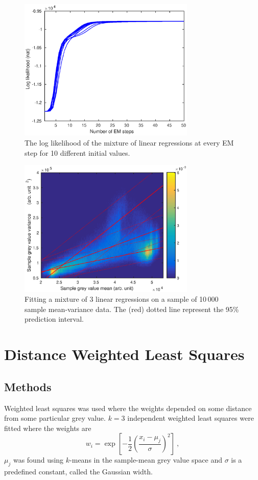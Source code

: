 \documentclass[12pt]{report}
\begin{document}
\begin{figure}[p]
	\centering	
	\includegraphics[width=0.75\textwidth]{figures/meanVar/mixture_lnL.eps}
	\caption{The log likelihood of the mixture of linear regressions at every EM step for 10 different initial values.}
	\label{fig:mixture_lnL}
\end{figure}

\begin{figure}[p]
	\centering	
	\includegraphics[width=0.75\textwidth]{figures/meanVar/mixture_histogram.eps}
	\caption{Fitting a mixture of 3 linear regressions on a sample of 10\,000 sample mean-variance data. The (red) dotted line represent the 95\% prediction interval.}
	\label{fig:mixture_histogram}
\end{figure}

\section{Distance Weighted Least Squares}
\subsection{Methods}
Weighted least squares was used where the weights depended on some distance from some particular grey value. $k=3$ independent weighted least squares were fitted where the weights are
\begin{equation}
w_i=\exp\left[-\frac{1}{2}\left(\frac{x_i-\mu_j}{\sigma}\right)^2\right] \ ,
\end{equation}
$\mu_j$ was found using $k$-means \cite[p.~446]{barber2012bayesian} in the sample-mean grey value space and $\sigma$ is a predefined constant, called the Gaussian width.
\end{document}
